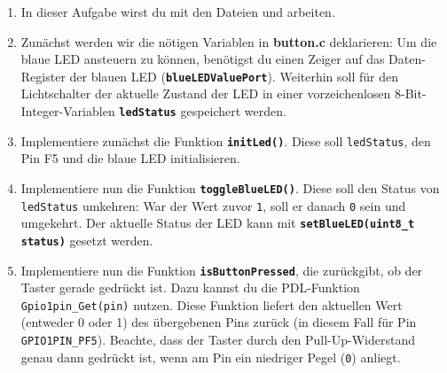 \begin{enumerate}
\item 
In dieser Aufgabe wirst du mit den Dateien  und  arbeiten.

\item 
Zunächst werden wir die nötigen Variablen in \textbf{button.c} deklarieren:
Um die blaue LED ansteuern zu können, benötigst du einen Zeiger auf das Daten-Register der blauen LED (\textbf{\lstinline|blueLEDValuePort|}).
Weiterhin soll für den Lichtschalter der aktuelle Zustand der LED in einer vorzeichenlosen 8-Bit-Integer-Variablen \textbf{\lstinline|ledStatus|} gespeichert werden.

\item
Implementiere zunächst die Funktion \textbf{\lstinline|initLed()|}.
Diese soll \lstinline|ledStatus|, den Pin F5 und die blaue LED initialisieren.

\item
Implementiere nun die Funktion \textbf{\lstinline|toggleBlueLED()|}.
Diese soll den Status von \lstinline|ledStatus| umkehren:
War der Wert zuvor \lstinline|1|, soll er danach \lstinline|0| sein und umgekehrt.
Der aktuelle Status der LED kann mit \textbf{\lstinline|setBlueLED(uint8_t status)|} gesetzt werden. 

\item 
Implementiere nun die Funktion \textbf{\lstinline|isButtonPressed|}, die zurückgibt, ob der Taster gerade gedrückt ist.
Dazu kannst du die PDL-Funktion \lstinline|Gpio1pin_Get(pin)| nutzen.
Diese Funktion liefert den aktuellen Wert (entweder 0 oder 1) des übergebenen Pins zurück (in diesem Fall für Pin \lstinline|GPIO1PIN_PF5|).
Beachte, dass der Taster durch den Pull-Up-Widerstand genau dann gedrückt ist, wenn am Pin ein niedriger Pegel (\lstinline|0|) anliegt.


\end{enumerate}
